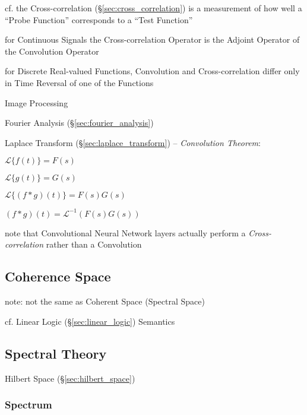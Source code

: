 cf. the Cross-correlation (\S\ref{sec:cross_correlation}) is a measurement of
how well a ``Probe Function'' corresponds to a ``Test Function''

for Continuous Signals the Cross-correlation Operator is the Adjoint Operator of
the Convolution Operator

for Discrete Real-valued Functions, Convolution and Cross-correlation differ
only in Time Reversal of one of the Functions

Image Processing

\fist Fourier Analysis (\S\ref{sec:fourier_analysis})

Laplace Transform (\S\ref{sec:laplace_transform}) -- \emph{Convolution Theorem}:

$\mathcal{L}\{f(t)\} = F(s)$

$\mathcal{L}\{g(t)\} = G(s)$

$\mathcal{L}\{(f * g)(t)\} = F(s)G(s)$

$(f*g)(t) = \mathcal{L}^{-1}(F(s)G(s))$

note that Convolutional Neural Network layers actually perform a
\emph{Cross-correlation} rather than a Convolution



\subsection{Coherence Space}\label{sec:coherence_space}

note: not the same as Coherent Space (Spectral Space)

cf. Linear Logic (\S\ref{sec:linear_logic}) Semantics



\subsection{Spectral Theory}\label{sec:spectral_theory}

Hilbert Space (\S\ref{sec:hilbert_space})



\subsubsection{Spectrum}\label{sec:spectrum}

